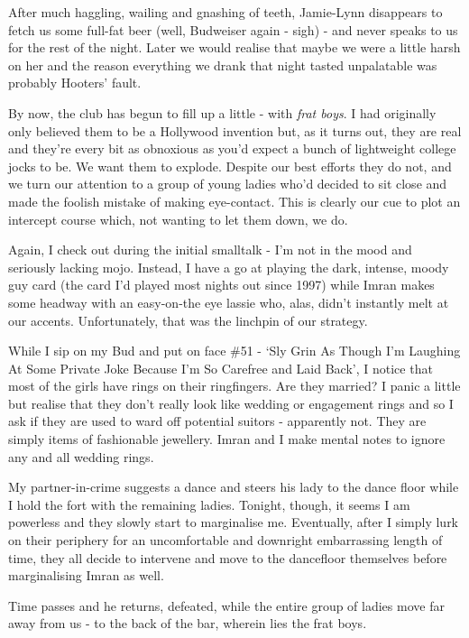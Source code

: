 \documentclass[a5paper,titlepage,11pt]{book}
\begin{document}
After much haggling, wailing and gnashing of teeth, Jamie-Lynn disappears to fetch us some full-fat beer (well, Budweiser again - sigh) - and never speaks to us for the rest of the night. Later we would realise that maybe we were a little harsh on her and the reason everything we drank that night tasted unpalatable was probably Hooters' fault.

By now, the club has begun to fill up a little - with \emph{frat boys}. I had originally only believed them to be a Hollywood invention but, as it turns out, they are real and they're every bit as obnoxious as you'd expect a bunch of lightweight college jocks to be. We want them to explode. Despite our best efforts they do not, and we turn our attention to a group of young ladies who'd decided to sit close and made the foolish mistake of making eye-contact. This is clearly our cue to plot an intercept course which, not wanting to let them down, we do.

Again, I check out during the initial smalltalk - I'm not in the mood and seriously lacking mojo. Instead, I have a go at playing the dark, intense, moody guy card (the card I'd played most nights out since 1997) while Imran makes some headway with an easy-on-the eye lassie who, alas, didn't instantly melt at our accents. Unfortunately, that was the linchpin of our strategy.

While I sip on my Bud and put on face \#51 - `Sly Grin As Though I'm Laughing At Some Private Joke Because I'm So Carefree and Laid Back', I notice that most of the girls have rings on their ringfingers. Are they married?  I panic a little but realise that they don't really look like wedding or engagement rings and so I ask if they are used to ward off potential suitors - apparently not. They are simply items of fashionable jewellery. Imran and I make mental notes to ignore any and all wedding rings.

My partner-in-crime suggests a dance and steers his lady to the dance floor while I hold the fort with the remaining ladies. Tonight, though, it seems I am powerless and they slowly start to marginalise me. Eventually, after I simply lurk on their periphery for an uncomfortable and downright embarrassing length of time, they all decide to intervene and move to the dancefloor themselves before marginalising Imran as well.

Time passes and he returns, defeated, while the entire group of ladies move far away from us - to the back of the bar, wherein lies the frat boys.
\end{document}
